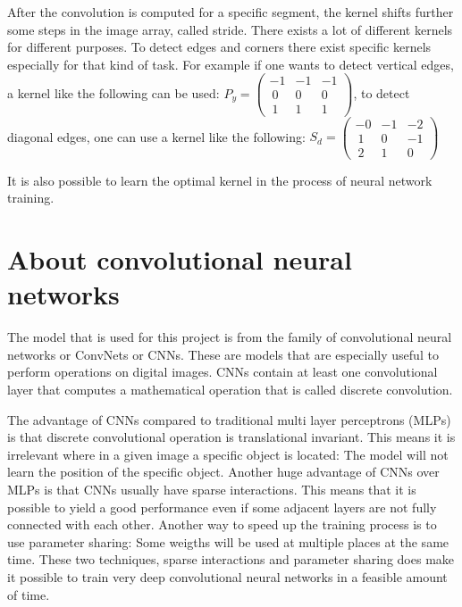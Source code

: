 After the convolution is computed for a specific segment, the kernel shifts further some steps in the image array, called stride. There exists a lot of different kernels for different purposes. To detect edges and corners there exist specific kernels especially for that kind of task. For example if one wants to detect vertical edges, a kernel like the following can be used:
$P_y = \begin{pmatrix}-1 & -1 & -1 \\\ 0 & 0 & 0 \\\ 1 & 1 & 1\end{pmatrix}$, \vspace{0.5cm} to detect diagonal edges, one can use a kernel like the following:
$S_d = \begin{pmatrix}-0 & -1 & -2 \\\ 1 & 0 & -1 \\\ 2 & 1 & 0\end{pmatrix}$ \vspace{0.5cm}

It is also possible to learn the optimal kernel in the process of neural network training.

\section{About convolutional neural networks}

The model that is used for this project is from the family of convolutional neural networks or ConvNets or CNNs. These are models that are especially useful to perform operations on digital images. CNNs contain at least one convolutional layer that computes a mathematical operation that is called discrete convolution. 

The advantage of CNNs compared to traditional multi layer perceptrons (MLPs) is that discrete convolutional operation is translational invariant. This means it is irrelevant where in a given image a specific object is located: The model will not learn the position of the specific object. Another huge advantage of CNNs over MLPs is that CNNs usually have sparse interactions. This means that it is possible to yield a good performance even if some adjacent layers are not fully connected with each other. Another way to speed up the training process is to use parameter sharing: Some weigths will be used at multiple places at the same time. These two techniques, sparse interactions and parameter sharing does make it possible to train very deep convolutional neural networks in a feasible amount of time. \cite{DL}

